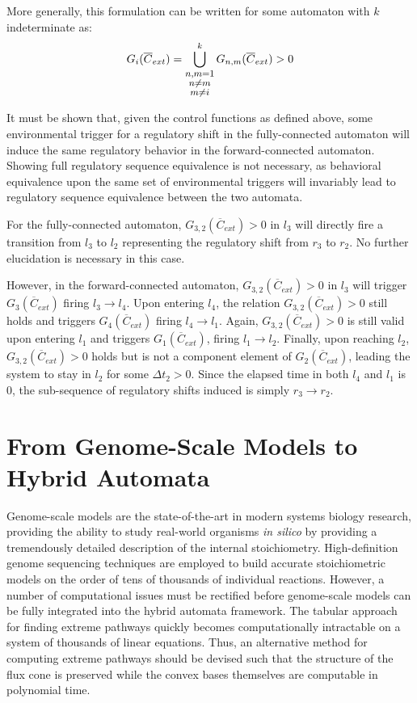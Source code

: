More generally, this formulation can be written for some automaton with $k$ indeterminate as:
\[
    \large
    G_{i}(\overline{C}_{ext}) = \bigcup^k_{\substack{n,m=1 \\  n \neq m \\ m \neq i}} G_{n,m}(\overline{C}_{ext}) > 0
\]

It must be shown that, given the control functions as defined above, some environmental trigger for a regulatory shift in the fully-connected automaton will induce the same regulatory behavior in the forward-connected automaton. Showing full regulatory sequence equivalence is not necessary, as behavioral equivalence upon the same set of environmental triggers will invariably lead to regulatory sequence equivalence between the two automata.

For the fully-connected automaton, $G_{3,2}(\overline{C}_{ext}) > 0$ in $l_3$ will directly fire a transition from $l_3$ to $l_2$ representing the regulatory shift from $r_3$ to $r_2$. No further elucidation is necessary in this case.

However, in the forward-connected automaton, $G_{3,2}(\overline{C}_{ext}) > 0$ in $l_3$ will trigger $G_{3}(\overline{C}_{ext})$ firing $l_3 \rightarrow l_4$. Upon entering $l_4$, the relation $G_{3,2}(\overline{C}_{ext}) > 0$ still holds and triggers $G_{4}(\overline{C}_{ext})$ firing $l_4 \rightarrow l_1$. Again, $G_{3,2}(\overline{C}_{ext}) > 0$ is still valid upon entering $l_1$ and triggers $G_{1}(\overline{C}_{ext})$, firing $l_1 \rightarrow l_2$. Finally, upon reaching $l_2$, $G_{3,2}(\overline{C}_{ext}) > 0$ holds but is not a component element of $G_{2}(\overline{C}_{ext})$, leading the system to stay in $l_2$ for some $\Delta t_2 > 0$. Since the elapsed time in both $l_4$ and $l_1$ is $0$, the sub-sequence of regulatory shifts induced is simply $r_3 \rightarrow r_2$.





\section{From Genome-Scale Models to Hybrid Automata}

Genome-scale models are the state-of-the-art in modern systems biology research, providing the ability to study real-world organisms \textit{in silico} by providing a tremendously detailed description of the internal stoichiometry. High-definition genome sequencing techniques are employed to build accurate stoichiometric models on the order of tens of thousands of individual reactions. However, a number of computational issues must be rectified before genome-scale models can be fully integrated into the hybrid automata framework. The tabular approach for finding extreme pathways quickly becomes computationally intractable on a system of thousands of linear equations. Thus, an alternative method for computing extreme pathways should be devised such that the structure of the flux cone is preserved while the convex bases themselves are computable in polynomial time.

